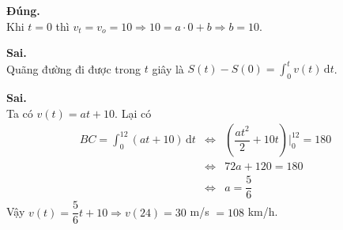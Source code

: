 \begin{ex}
{\begin{itemchoice}
            \itemch \textbf{Đúng.}\\
            Khi $t=0$ thì $v_t=v_o=10\Rightarrow 10=a\cdot 0 +b\Rightarrow b=10$.
            
            \itemch\textbf{Sai.}\\
            Quãng đường đi được trong $t$ giây là $S(t)-S(0)=\displaystyle \int_0^t v(t) \mathrm{\,d}t$.
            
            \itemch \textbf{Sai.}
            \\
            Ta có $v(t)=at+10$.	Lại có 
            \begin{eqnarray*}
                BC=\displaystyle\int_0^{12} (at+10) \mathrm{\,d}t
                &\Leftrightarrow&	\left( \dfrac{at^2}{2}+10t\right)\Bigg|_0^{12}=180
                \\
                &\Leftrightarrow& 72a+120=180
                \\
                &\Leftrightarrow& a=\dfrac{5}{6}
            \end{eqnarray*}
            Vậy $v(t)=\dfrac{5}{6}t +10 \Rightarrow v(24)=30$ m/s $=108$ km/h. 
        \end{itemchoice}
    }
\end{ex}



